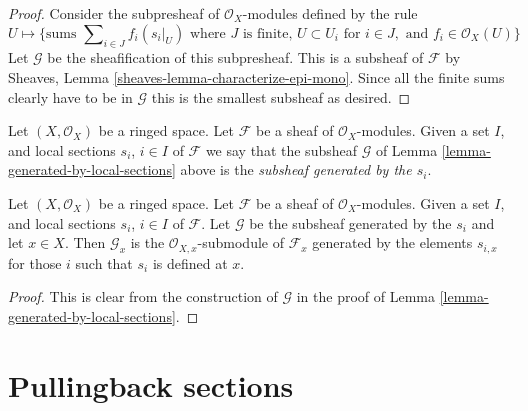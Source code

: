 \begin{proof}
Consider the subpresheaf of $\mathcal{O}_X$-modules
defined by the rule
$$
U
\longmapsto
\{
\text{sums } \sum\nolimits_{i \in J} f_i (s_i|_U)
\text{ where } J \text{ is finite, }
U \subset U_i \text{ for } i\in J, \text{ and }
f_i \in \mathcal{O}_X(U)
\}
$$
Let $\mathcal{G}$ be the sheafification of this subpresheaf.
This is a subsheaf of $\mathcal{F}$ by
Sheaves, Lemma \ref{sheaves-lemma-characterize-epi-mono}.
Since all the finite sums clearly have to be in $\mathcal{G}$
this is the smallest subsheaf as desired.
\end{proof}

\begin{definition}
\label{definition-generated-by-local-sections}
Let $(X, \mathcal{O}_X)$ be a ringed space.
Let $\mathcal{F}$ be a sheaf of $\mathcal{O}_X$-modules.
Given a set $I$, and
local sections $s_i$, $i \in I$ of $\mathcal{F}$
we say that the subsheaf $\mathcal{G}$ of
Lemma \ref{lemma-generated-by-local-sections}
above is the {\it subsheaf generated by the $s_i$}.
\end{definition}

\begin{lemma}
\label{lemma-generated-by-local-sections-stalk}
Let $(X, \mathcal{O}_X)$ be a ringed space.
Let $\mathcal{F}$ be a sheaf of $\mathcal{O}_X$-modules.
Given a set $I$, and
local sections $s_i$, $i \in I$ of $\mathcal{F}$.
Let $\mathcal{G}$ be the subsheaf generated by the
$s_i$ and let $x\in X$.
Then $\mathcal{G}_x$ is the $\mathcal{O}_{X, x}$-submodule of
$\mathcal{F}_x$ generated by the elements $s_{i, x}$
for those $i$ such that $s_i$ is defined at $x$.
\end{lemma}

\begin{proof}
This is clear from the construction of $\mathcal{G}$
in the proof of Lemma \ref{lemma-generated-by-local-sections}.
\end{proof}





\section{Pullingback sections}
\label{section-pullback-section}

